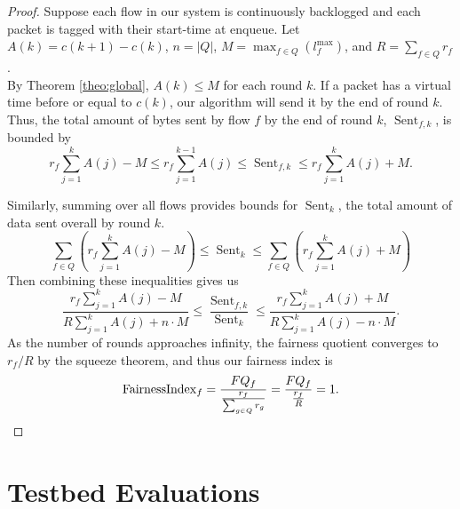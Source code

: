 \begin{proof}
    Suppose each flow in our system is continuously backlogged and each packet is tagged with their start-time at enqueue.
    Let $A(k) = c(k+1) - c(k)$, $n = |Q|$, $M = \max_{f \in Q}\left(l_f^{\max}\right) $, and $R = \sum_{f \in Q} r_f$.\\
    
    By Theorem \ref{theo:global}, $A(k) \leq M$ for each round $k$.
    If a packet has a virtual time before or equal to $c(k)$, our algorithm will send it by the end of round $k$.
    Thus, the total amount of bytes sent by flow $f$ by the end of round $k$, $\operatorname{Sent}_{f,k}$, is bounded by
    $$r_f \sum_{j=1}^{k} A(j) - M \leq r_f \sum_{j=1}^{k-1} A(j) \leq \operatorname{Sent}_{f,k} \leq r_f \sum_{j=1}^{k} A(j) + M .$$
    
    Similarly, summing over all flows provides bounds for $\operatorname{Sent}_{k}$, the total amount of data sent overall by round $k$.
    $$\sum_{f \in Q} \left( r_f \sum_{j=1}^{k} A(j) - M \right) \leq \operatorname{Sent}_{k} \leq \sum_{f \in Q} \left( r_f \sum_{j=1}^{k} A(j) + M \right)$$
    Then combining these inequalities gives us
    $$\frac{r_f \sum_{j=1}^{k} A(j) - M}{R \sum_{j=1}^{k} A(j) + n \cdot M} \leq \frac{\operatorname{Sent}_{f,k}}{\operatorname{Sent}_{k}} \leq \frac{r_f \sum_{j=1}^{k} A(j) + M}{R \sum_{j=1}^{k} A(j) - n \cdot M}.$$
    As the number of rounds approaches infinity, the fairness quotient converges to $r_f / R$ by the squeeze theorem, and thus our fairness index is
    $$\operatorname{FairnessIndex}_f = \frac{FQ_f}{\frac{r_f}{\sum_{g \in Q} r_g}} = \frac{FQ_f}{\frac{r_f}{R}} = 1.  \qedhere$$
\end{proof}


\section{Testbed Evaluations}
\label{sec:scrr-evaluation}


